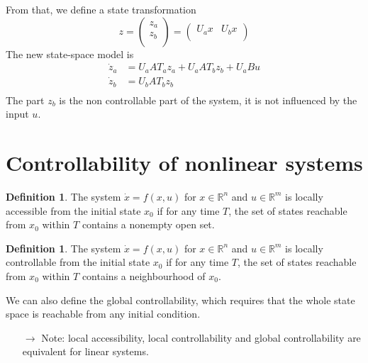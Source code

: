 \documentclass[12pt, openany]{report}
\theoremstyle{definition}
\newtheorem{definition}[thm]{Definition}
\newcommand{\R}{\mathbb{R}}
\begin{document}
From that, we define a state transformation 
\begin{equation}
    z = \begin{pmatrix}
        z_a \\ z_b\\
    \end{pmatrix} = \begin{pmatrix}
        U_ax & U_bx\\
    \end{pmatrix}
\end{equation}
The new state-space model is 
\begin{align}
    \dot z_a &= U_aAT_az_a + U_aAT_bz_b + U_aBu\\
    \dot z_b &= U_bAT_bz_b\\
\end{align}
The part \(z_b\) is the non controllable part of the system, it is not influenced by the input \(u\).
\section{Controllability of nonlinear systems}
\begin{definition}
    The system \(\dot x = f(x,u)\) for \(x\in \R^n\) and \(u\in \R^m\) is locally accessible from the initial state \(x_0\) if for any time \(T\), the set of states reachable from \(x_0\) within \(T\) contains a nonempty open set.
\end{definition}
\begin{definition}
    The system \(\dot x=f(x,u)\) for \(x\in \R^n\) and \(u\in \R^m\) is locally controllable from the initial state \(x_0\) if for any time \(T\), the set of states reachable from \(x_0\) within \(T\) contains a neighbourhood of \(x_0\). 
\end{definition}
We can also define the global controllability, which requires that the whole state space is reachable from any initial condition. 
\begin{itemize}
    \item [\(\rightarrow\)] Note: local accessibility, local controllability and global controllability are equivalent for linear systems.
\end{itemize}
\end{document}
